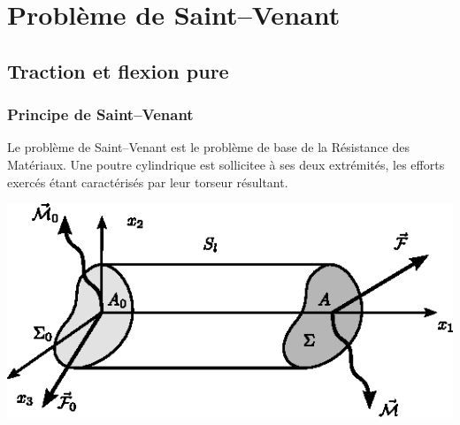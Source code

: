 \chapter{Problème de Saint--Venant} \label{chap:Ch07} 
\section{Traction et flexion pure} \label{sec:Ch07-1}
\subsection{Principe de Saint--Venant} \label{ssec:Ch07-1.1}
Le problème de Saint--Venant est le problème de base de la Résistance des Matériaux.
Une poutre cylindrique est sollicitee à ses deux extrémités, les efforts exercés étant caractérisés par leur torseur résultant.

\begin{center}
\includegraphics{../images/T1_Ch07-01}
\end{center}

